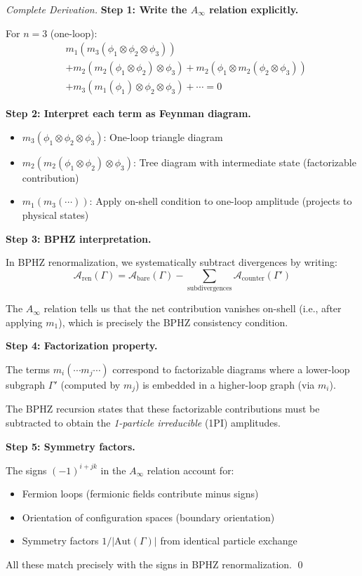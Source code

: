 \begin{proof}[Complete Derivation]
\textbf{Step 1: Write the $A_\infty$ relation explicitly.}

For $n=3$ (one-loop):
\begin{align*}
&m_1(m_3(\phi_1 \otimes \phi_2 \otimes \phi_3)) \\
&+ m_2(m_2(\phi_1 \otimes \phi_2) \otimes \phi_3) + m_2(\phi_1 \otimes m_2(\phi_2 
\otimes \phi_3)) \\
&+ m_3(m_1(\phi_1) \otimes \phi_2 \otimes \phi_3) + \cdots = 0
\end{align*}

\textbf{Step 2: Interpret each term as Feynman diagram.}

\begin{itemize}
\item $m_3(\phi_1 \otimes \phi_2 \otimes \phi_3)$: One-loop triangle diagram

\item $m_2(m_2(\phi_1 \otimes \phi_2) \otimes \phi_3)$: Tree diagram with 
intermediate state (factorizable contribution)

\item $m_1(m_3(\cdots))$: Apply on-shell condition to one-loop amplitude 
(projects to physical states)
\end{itemize}

\textbf{Step 3: BPHZ interpretation.}

In BPHZ renormalization, we systematically subtract divergences by writing:
$$\mathcal{A}_{\text{ren}}(\Gamma) = \mathcal{A}_{\text{bare}}(\Gamma) - 
\sum_{\text{subdivergences}} \mathcal{A}_{\text{counter}}(\Gamma')$$

The $A_\infty$ relation tells us that the net contribution vanishes on-shell (i.e., 
after applying $m_1$), which is precisely the BPHZ consistency condition.

\textbf{Step 4: Factorization property.}

The terms $m_i(\cdots m_j \cdots)$ correspond to factorizable diagrams where a 
lower-loop subgraph $\Gamma'$ (computed by $m_j$) is embedded in a higher-loop 
graph (via $m_i$).

The BPHZ recursion states that these factorizable contributions must be subtracted 
to obtain the \emph{1-particle irreducible} (1PI) amplitudes.

\textbf{Step 5: Symmetry factors.}

The signs $(-1)^{i+jk}$ in the $A_\infty$ relation account for:
\begin{itemize}
\item Fermion loops (fermionic fields contribute minus signs)
\item Orientation of configuration spaces (boundary orientation)
\item Symmetry factors $1/|\text{Aut}(\Gamma)|$ from identical particle exchange
\end{itemize}

All these match precisely with the signs in BPHZ renormalization.
\qed
\end{proof}

